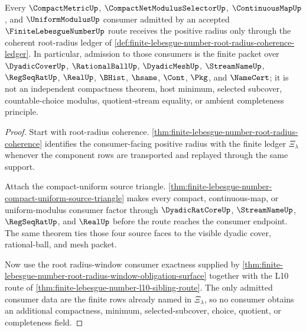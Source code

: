 \begin{theorem}
\label{thm:finite-lebesgue-number-compact-uniform-radius-admission}
Every $\CompactMetricUp$, $\CompactNetModulusSelectorUp$, $\ContinuousMapUp$, and $\UniformModulusUp$ consumer admitted by an accepted $\FiniteLebesgueNumberUp$ route receives the positive radius only through the coherent root-radius ledger of \autoref{def:finite-lebesgue-number-root-radius-coherence-ledger}. In particular, admission to those consumers is the finite packet over $\DyadicCoverUp$, $\RationalBallUp$, $\DyadicMeshUp$, $\StreamNameUp$, $\RegSeqRatUp$, $\RealUp$, $\BHist$, $\hsame$, $\Cont$, $\Pkg$, and $\NameCert$; it is not an independent compactness theorem, host minimum, selected subcover, countable-choice modulus, quotient-stream equality, or ambient completeness principle.
\end{theorem}
\begin{proof}
Start with root-radius coherence. \autoref{thm:finite-lebesgue-number-root-radius-coherence} identifies the consumer-facing positive radius with the finite ledger $\Xi_{\lambda}$ whenever the component rows are transported and replayed through the same support.

Attach the compact-uniform source triangle. \autoref{thm:finite-lebesgue-number-compact-uniform-source-triangle} makes every compact, continuous-map, or uniform-modulus consumer factor through $\DyadicRatCoreUp$, $\StreamNameUp$, $\RegSeqRatUp$, and $\RealUp$ before the route reaches the consumer endpoint. The same theorem ties those four source faces to the visible dyadic cover, rational-ball, and mesh packet.

Now use the root radius-window consumer exactness supplied by \autoref{thm:finite-lebesgue-number-root-radius-window-obligation-surface} together with the L10 route of \autoref{thm:finite-lebesgue-number-l10-sibling-route}. The only admitted consumer data are the finite rows already named in $\Xi_{\lambda}$, so no consumer obtains an additional compactness, minimum, selected-subcover, choice, quotient, or completeness field.
\end{proof}

